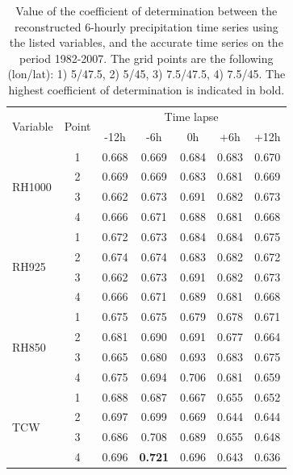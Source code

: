 \documentclass[hess]{copernicus}
\begin{document}
\begin{table}[htb]
	\caption{Value of the coefficient of determination between the reconstructed 6-hourly precipitation time series using the listed variables, and the accurate time series on the period 1982-2007. The grid points are the following (lon/lat): 1) 5\textdegree/47.5\textdegree, 2) 5\textdegree/45\textdegree, 3) 7.5\textdegree/47.5\textdegree, 4) 7.5\textdegree/45\textdegree. The highest coefficient of determination is indicated in bold.}
	\begin{center}
		\begin{tabular}{l c c c c c c}
			\hline
			\multirow{2}{*}{Variable} & \multirow{2}{*}{Point} &  \multicolumn{5}{c}{Time lapse} \\
			&  & -12h & -6h & 0h & +6h & +12h \\ 
			\hline
			\multirow{ 4}{*}{RH1000} & 1 & 0.668 & 0.669 & 0.684 & 0.683 & 0.670 \\
			& 2 & 0.669 & 0.669 & 0.683 & 0.681 & 0.669 \\
			& 3 & 0.662 & 0.673 & 0.691 & 0.682 & 0.673 \\
			& 4 & 0.666 & 0.671 & 0.688 & 0.681 & 0.668 \\ \hline
			\multirow{ 4}{*}{RH925} & 1 & 0.672 & 0.673 & 0.684 & 0.684 & 0.675 \\
			& 2 & 0.674 & 0.674 & 0.683 & 0.682 & 0.672 \\
			& 3 & 0.662 & 0.673 & 0.691 & 0.682 & 0.673 \\
			& 4 & 0.666 & 0.671 & 0.689 & 0.681 & 0.668 \\ \hline
			\multirow{ 4}{*}{RH850} & 1 & 0.675 & 0.675 & 0.679 & 0.678 & 0.671 \\
			& 2 & 0.681 & 0.690 & 0.691 & 0.677 & 0.664 \\
			& 3 & 0.665 & 0.680 & 0.693 & 0.683 & 0.675 \\
			& 4 & 0.675 & 0.694 & 0.706 & 0.681 & 0.659 \\ \hline
			\multirow{ 4}{*}{TCW} & 1 & 0.688 & 0.687 & 0.667 & 0.655 & 0.652 \\
			& 2 & 0.697 & 0.699 & 0.669 & 0.644 & 0.644 \\
			& 3 & 0.686 & 0.708 & 0.689 & 0.655 & 0.648 \\
			& 4 & 0.696 & \textbf{0.721} & 0.696 & 0.643 & 0.636 \\ \hline
		\end{tabular}
	\end{center}
	\label{table:proxy_correlations}
\end{table}
\end{document}
